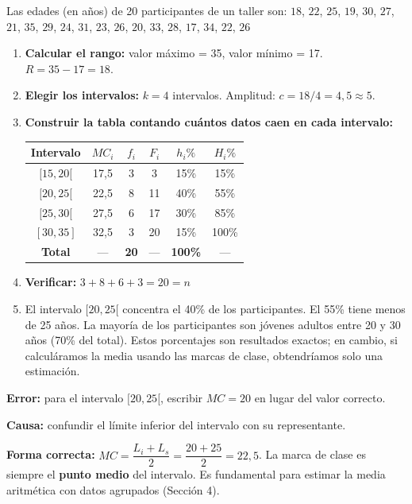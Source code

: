 \documentclass[11pt, letterpaper]{article}
\begin{document}
\begin{tcolorbox}[examplebox, title={Ej. 4. Tabla de frecuencias para datos agrupados}]
Las edades (en años) de 20 participantes de un taller son:
$18$, $22$, $25$, $19$, $30$, $27$, $21$, $35$, $29$, $24$,
$31$, $23$, $26$, $20$, $33$, $28$, $17$, $34$, $22$, $26$

\begin{enumerate}[label=\textbf{\arabic*.}, leftmargin=2.8cm]
  \item[\textbf{Paso 1.}] \textbf{Calcular el rango:} valor máximo = 35, valor mínimo = 17. \quad $R = 35 - 17 = 18$.
  \medskip
  \item[\textbf{Paso 2.}] \textbf{Elegir los intervalos:} $k = 4$ intervalos. Amplitud: $c = 18/4 = 4{,}5 \approx 5$.
  \medskip
  \item[\textbf{Paso 3.}] \textbf{Construir la tabla contando cuántos datos caen en cada intervalo:}
  \begin{center}
  \renewcommand{\arraystretch}{1.3}
  \begin{tabular}{c c c c c c}
  \toprule
  Intervalo & $MC_i$ & $f_i$ & $F_i$ & $h_i\%$ & $H_i\%$\\
  \midrule
  $[15,20[$ & 17{,}5 & 3 & 3  & 15\% & 15\%\\
  $[20,25[$ & 22{,}5 & 8 & 11 & 40\% & 55\%\\
  $[25,30[$ & 27{,}5 & 6 & 17 & 30\% & 85\%\\
  $[30,35]$ & 32{,}5 & 3 & 20 & 15\% & 100\%\\
  \midrule
  \textbf{Total} & --- & \textbf{20} & --- & \textbf{100\%} & ---\\
  \bottomrule
  \end{tabular}
  \end{center}
  \medskip
  \item[\textbf{Paso 4.}] \textbf{Verificar:} $3+8+6+3 = 20 = n$ \checkmark
  \medskip
  \item[\textbf{Conclusión.}] El intervalo $[20,25[$ concentra el 40\% de los participantes. El 55\% tiene menos de 25 años. La mayoría de los participantes son jóvenes adultos entre 20 y 30 años (70\% del total). Estos porcentajes son resultados exactos; en cambio, si calculáramos la media usando las marcas de clase, obtendríamos solo una estimación.
\end{enumerate}
\end{tcolorbox}

\begin{tcolorbox}[warningbox, title={Error frecuente: usar el límite del intervalo como marca de clase}]
\textbf{Error:} para el intervalo $[20, 25[$, escribir $MC = 20$ en lugar del valor correcto.

\medskip
\textbf{Causa:} confundir el límite inferior del intervalo con su representante.

\medskip
\textbf{Forma correcta:} $MC = \dfrac{L_i + L_s}{2} = \dfrac{20 + 25}{2} = 22{,}5$. La marca de clase es siempre el \textbf{punto medio} del intervalo. Es fundamental para estimar la media aritmética con datos agrupados (Sección 4).
\end{tcolorbox}
\end{document}

